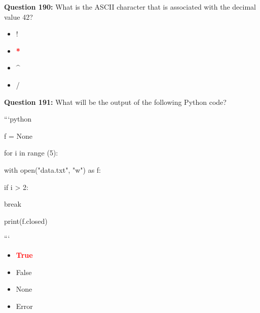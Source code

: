 \documentclass[12pt,a4paper]{article}
\begin{document}
\vspace{0.5cm}

\textbf{Question 190:} What is the ASCII character that is associated with the decimal value 42?

\begin{itemize}
    \item[\textbf{A.}] !
    \item[\textbf{B.}] \textcolor{red}{\textbf{*}}
    \item[\textbf{C.}] ^
    \item[\textbf{D.}] /
\end{itemize}

\vspace{0.5cm}

\textbf{Question 191:} What will be the output of the following Python code?\newline

\newline
\newline

\newline
```python\newline

\newline
f = None\newline

\newline
for i in range (5):\newline

\newline
    with open("data.txt", "w") as f:\newline

\newline
        if i > 2:\newline

\newline
            break\newline

\newline
print(f.closed)\newline

\newline
```

\begin{itemize}
    \item[\textbf{A.}] \textcolor{red}{\textbf{True}}
    \item[\textbf{B.}] False
    \item[\textbf{C.}] None
    \item[\textbf{D.}] Error
\end{itemize}
\end{document}

